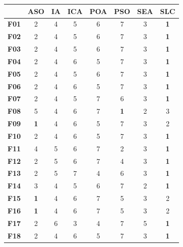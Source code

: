 \begin{table}
	\centering
	\begin{tabular}{cccccccc}
		\toprule
		{} &    \textbf{ASO} &     \textbf{IA} &    \textbf{ICA} &    \textbf{POA} &    \textbf{PSO} &    \textbf{SEA} &    \textbf{SLC} \\
		\midrule
		\textbf{F01}  &      2 &      4 &      5 &      6 &      7 &      3 &      \textbf{1} \\
		\textbf{F02}  &      2 &      4 &      5 &      6 &      7 &      3 &      \textbf{1} \\
		\textbf{F03}  &      2 &      4 &      5 &      6 &      7 &      3 &      \textbf{1} \\
		\textbf{F04}  &      2 &      4 &      6 &      5 &      7 &      3 &      \textbf{1} \\
		\textbf{F05}  &      2 &      4 &      5 &      6 &      7 &      3 &      \textbf{1} \\
		\textbf{F06}  &      2 &      4 &      6 &      5 &      7 &      3 &      \textbf{1} \\
		\textbf{F07}  &      2 &      4 &      5 &      7 &      6 &      3 &      \textbf{1} \\
		\textbf{F08}  &      5 &      4 &      6 &      7 &      \textbf{1} &      2 &      3 \\
		\textbf{F09}  &      \textbf{1} &      4 &      6 &      5 &      7 &      3 &      2 \\
		\textbf{F10}  &      2 &      4 &      6 &      5 &      7 &      3 &      \textbf{1} \\
		\textbf{F11}  &      4 &      5 &      6 &      7 &      2 &      3 &      \textbf{1} \\
		\textbf{F12}  &      2 &      5 &      6 &      7 &      4 &      3 &      \textbf{1} \\
		\textbf{F13}  &      2 &      5 &      7 &      4 &      6 &      3 &      \textbf{1} \\
		\textbf{F14}  &      3 &      4 &      5 &      6 &      7 &      2 &      \textbf{1} \\
		\textbf{F15}  &      \textbf{1} &      4 &      6 &      7 &      5 &      3 &      2 \\
		\textbf{F16}  &      \textbf{1} &      4 &      6 &      7 &      5 &      3 &      2 \\
		\textbf{F17}  &      2 &      6 &      3 &      4 &      7 &      5 &      \textbf{1} \\
		\textbf{F18}  &      2 &      4 &      6 &      5 &      7 &      3 &      \textbf{1} \\

\end{tabular}
\end{table}
